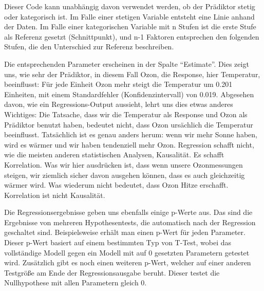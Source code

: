 \documentclass[a4paper,twoside]{tufte-book}\usepackage[]{graphicx}\usepackage[]{color}
\begin{document}
Dieser Code kann unabhängig davon verwendet werden, ob der Prädiktor stetig oder kategorisch ist. Im Falle einer stetigen Variable entsteht eine Linie anhand der Daten. Im Falle einer kategorischen Variable mit n Stufen ist die erste Stufe als Referenz gesetzt (Schnittpunkt), und n-1 Faktoren entsprechen den folgenden Stufen, die den Unterschied zur Referenz beschreiben.

Die entsprechenden Parameter erscheinen in der Spalte "`Estimate"'. Dies zeigt uns, wie sehr der Prädiktor, in diesem Fall Ozon, die Response, hier Temperatur, beeinflusst: Für jede Einheit Ozon mehr steigt die Temperatur um 0.201 Einheiten, mit einem Standardfehler (Konfidenzintervall) von 0.019. Abgesehen davon, wie ein Regressions-Output aussieht, lehrt uns dies etwas anderes Wichtiges: Die Tatsache, dass wir die Temperatur als Response und Ozon als Prädiktor benutzt haben, bedeutet nicht, dass Ozon ursächlich die Temperatur beeinflusst. Tatsächlich ist es genau anders herum: wenn wir mehr Sonne haben, wird es wärmer und wir haben tendenziell mehr Ozon. Regression schafft nicht, wie die meisten anderen statistischen Analysen, Kausalität. Es schafft Korrelation. Was wir hier ausdrücken ist, dass wenn unsere Ozonmessungen steigen, wir ziemlich sicher davon ausgehen können, dass es auch gleichzeitig wärmer wird. Was wiederum nicht bedeutet, dass Ozon Hitze erschafft. Korrelation ist nicht Kausalität.

Die Regressionsergebnisse geben uns ebenfalls einige p-Werte aus. Das sind die Ergebnisse von mehreren Hypothesentests, die automatisch nach der Regression geschaltet sind. Beispielsweise erhält man einen p-Wert für jeden Parameter. Dieser p-Wert basiert auf einem bestimmten Typ von T-Test, wobei das vollständige Modell gegen ein Modell mit auf 0 gesetzten Parametern getestet wird. Zusätzlich gibt es noch einen weiteren p-Wert, welcher auf einer anderen Testgröße am Ende der Regressionsausgabe beruht. Dieser testet die Nullhypothese mit allen Parametern gleich 0.
\end{document}
